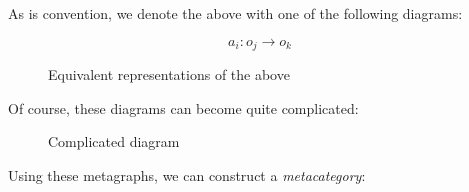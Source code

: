 \documentclass{fkbook}
\begin{document}
As is convention, we denote the above with one of the following
diagrams:
\begin{figure}[H]
  \centering
  \begin{minipage}{.33\linewidth}
    \[
      a_i : o_j \to o_k
    \]
  \end{minipage}
  \begin{minipage}{.33\linewidth}
  \end{minipage}
  \caption{Equivalent representations of the above}
\end{figure}
Of course, these diagrams can become quite complicated:
\begin{figure}[H]
  \centering
  \caption{Complicated diagram}
\end{figure}
Using these metagraphs, we can construct a \emph{metacategory}:
\end{document}
